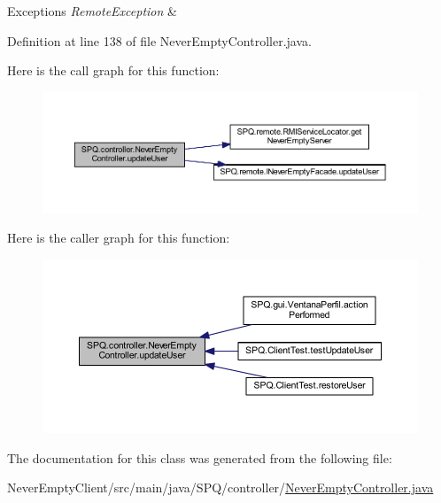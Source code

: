 \begin{DoxyExceptions}{Exceptions}
{\em Remote\+Exception} & \\
\hline
\end{DoxyExceptions}


Definition at line 138 of file Never\+Empty\+Controller.\+java.

Here is the call graph for this function\+:
\nopagebreak
\begin{figure}[H]
\begin{center}
\leavevmode
\includegraphics[width=350pt]{class_s_p_q_1_1controller_1_1_never_empty_controller_abac74fe36817d476abdd20d19df2092b_cgraph}
\end{center}
\end{figure}
Here is the caller graph for this function\+:
\nopagebreak
\begin{figure}[H]
\begin{center}
\leavevmode
\includegraphics[width=350pt]{class_s_p_q_1_1controller_1_1_never_empty_controller_abac74fe36817d476abdd20d19df2092b_icgraph}
\end{center}
\end{figure}


The documentation for this class was generated from the following file\+:\begin{DoxyCompactItemize}
\item 
Never\+Empty\+Client/src/main/java/\+S\+P\+Q/controller/\mbox{\hyperlink{_never_empty_controller_8java}{Never\+Empty\+Controller.\+java}}\end{DoxyCompactItemize}
